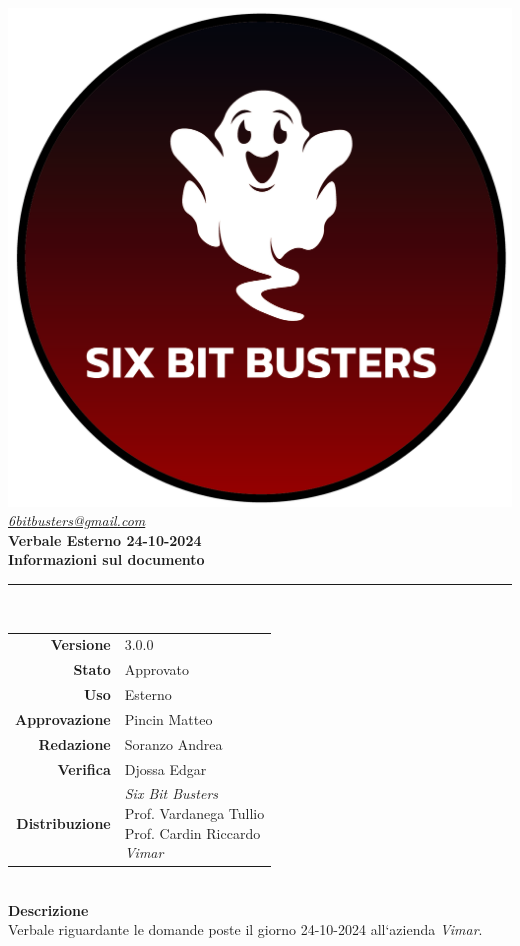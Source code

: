 \thispagestyle{empty}
\renewcommand{\arraystretch}{1.3}


\begin{titlepage}
	\begin{center}
		
	\includegraphics[scale = 0.7]{template/images/logo-circle.png}
	\\[1cm]
	\href{mailto:6bitbusters@gmail.com}		      	
	{\large{\textit{6bitbusters@gmail.com} } }\\[1cm]
	
	\Huge \textbf{Verbale Esterno 24-10-2024} \\[1cm]

	\large \textbf{Informazioni sul documento} \\
	\rule{0.6\textwidth}{0.4pt}
	\\[0.5cm]
	\begin{tabular}{r|l}
		\textbf{Versione} & 3.0.0\\
		\textbf{Stato} & Approvato\\
		\textbf{Uso} & Esterno\\                         
		\textbf{Approvazione} & Pincin Matteo \\                      
		\textbf{Redazione} & Soranzo Andrea\\ 
		\textbf{Verifica} & Djossa Edgar\\                         
		\textbf{Distribuzione} & \parbox[t]{5cm}{ \textit{Six Bit Busters} \\ Prof. Vardanega Tullio 
	 \\ Prof. Cardin Riccardo \\ \textit{Vimar}}
	\end{tabular}	
	\\[1.2cm]

	\large \textbf{Descrizione} \\
	Verbale riguardante le domande poste il giorno 24-10-2024 all`azienda \textit{Vimar}.
	
	\end{center}
\end{titlepage}
